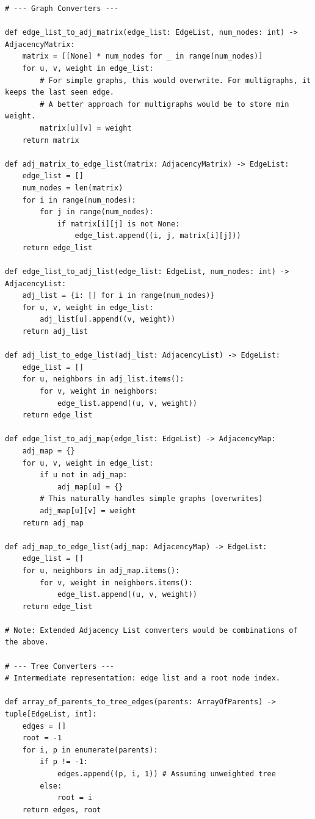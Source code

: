\documentclass[a4paper,12pt]{article}
\begin{document}
\begin{lstlisting}[style=pythonstyle, caption={Bộ chuyển đổi đồ thị và cây trong Python.}, label={lst:py_converters_4}]
# --- Graph Converters ---

def edge_list_to_adj_matrix(edge_list: EdgeList, num_nodes: int) -> AdjacencyMatrix:
    matrix = [[None] * num_nodes for _ in range(num_nodes)]
    for u, v, weight in edge_list:
        # For simple graphs, this would overwrite. For multigraphs, it keeps the last seen edge.
        # A better approach for multigraphs would be to store min weight.
        matrix[u][v] = weight
    return matrix

def adj_matrix_to_edge_list(matrix: AdjacencyMatrix) -> EdgeList:
    edge_list = []
    num_nodes = len(matrix)
    for i in range(num_nodes):
        for j in range(num_nodes):
            if matrix[i][j] is not None:
                edge_list.append((i, j, matrix[i][j]))
    return edge_list

def edge_list_to_adj_list(edge_list: EdgeList, num_nodes: int) -> AdjacencyList:
    adj_list = {i: [] for i in range(num_nodes)}
    for u, v, weight in edge_list:
        adj_list[u].append((v, weight))
    return adj_list

def adj_list_to_edge_list(adj_list: AdjacencyList) -> EdgeList:
    edge_list = []
    for u, neighbors in adj_list.items():
        for v, weight in neighbors:
            edge_list.append((u, v, weight))
    return edge_list

def edge_list_to_adj_map(edge_list: EdgeList) -> AdjacencyMap:
    adj_map = {}
    for u, v, weight in edge_list:
        if u not in adj_map:
            adj_map[u] = {}
        # This naturally handles simple graphs (overwrites)
        adj_map[u][v] = weight
    return adj_map
    
def adj_map_to_edge_list(adj_map: AdjacencyMap) -> EdgeList:
    edge_list = []
    for u, neighbors in adj_map.items():
        for v, weight in neighbors.items():
            edge_list.append((u, v, weight))
    return edge_list

# Note: Extended Adjacency List converters would be combinations of the above.

# --- Tree Converters ---
# Intermediate representation: edge list and a root node index.

def array_of_parents_to_tree_edges(parents: ArrayOfParents) -> tuple[EdgeList, int]:
    edges = []
    root = -1
    for i, p in enumerate(parents):
        if p != -1:
            edges.append((p, i, 1)) # Assuming unweighted tree
        else:
            root = i
    return edges, root


\end{lstlisting}
\end{document}
